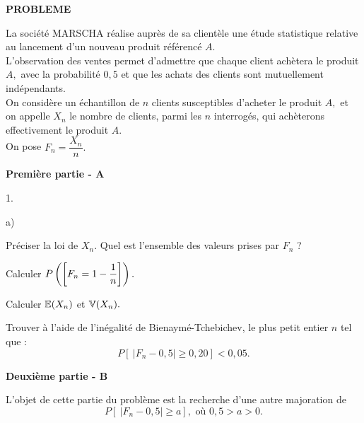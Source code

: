 \documentclass[11pt]{article}%
\begin{document}
\begin{center}
\textbf{PROBLEME}
\end{center}

\noindent La société MARSCHA réalise auprès de sa clientèle une étude
statistique relative au lancement d'un nouveau produit référencé $A.$\\
L'observation des ventes permet d'admettre que chaque client achètera
le
produit $A,$ avec la probabilité $0,5$ et que les achats des clients
sont
mutuellement indépendants.\\
On considère un échantillon de $n$ clients susceptibles d'acheter le
produit 
$A,$ et on appelle $X_{n}$ le nombre de clients, parmi les $n$
interrogés,
qui achèterons effectivement le produit $A.$\\
On pose $F_{n} = \dfrac{X_{n}}{n}.$

\begin{center}
\textbf{Première partie - A}
\end{center}

\begin{noliste}{1.}
 \setlength{\itemsep}{4mm}
\item 

\begin{noliste}{a)}
 \setlength{\itemsep}{2mm}
\item Préciser la loi de $X_{n}.$ Quel est l'ensemble des valeurs
prises par 
$F_{n}$ ?

\item Calculer $P\left(\left[ {F_{n} = 1-\dfrac{1}{n}} \right]\right).$

\item Calculer $\mathbb{E}(X_{n})$ et $\mathbb{V}(X_{n}).$
\end{noliste}

\item Trouver à l'aide de l'inégalité de Bienaymé-Tchebichev, le plus
petit
entier $n$ tel que :
\[
P\left[ \ \left| F_{n}-0,5\right| \geq 0,20\right] <0,05.
\]
$$
\end{noliste}

\begin{center}
\textbf{Deuxième partie - B}
\end{center}

L'objet de cette partie du problème est la recherche d'une autre
majoration
de 
\[
P\left[ \ \left| F_{n}-0,5\right| \geq a\right],\text{ où }0,5>a>0.
\]
\end{document}
